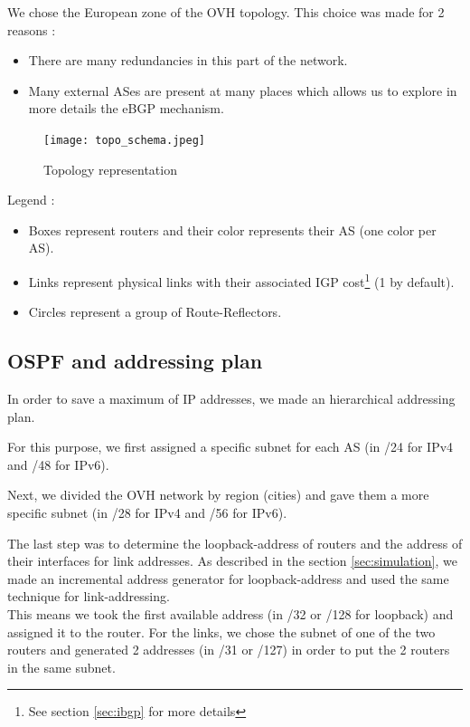 \documentclass[letter, 9pt, conference]{ieeeconf}
\begin{document}
We chose the European zone of the OVH \cite{OVHweathermap} topology. This choice was made for 2 reasons : 

\begin{itemize}
    \item There are many redundancies in this part of the network. 
    \item Many external ASes are present at many places which allows us to explore in more details the eBGP mechanism. 
\end{itemize}

\begin{figure}[H]
    \texttt{[image: topo\_schema.jpeg]}
    \caption{Topology representation}
    \label{fig:topo_schema}
\end{figure}

Legend : 
\begin{itemize}
    \item Boxes represent routers and their color represents their AS (one color per AS). 
    \item Links represent physical links with their associated IGP cost\footnote{See section \ref{sec:ibgp} for more details} (1 by default). 
    \item Circles represent a group of Route-Reflectors. 
\end{itemize}



\subsection{OSPF and addressing plan}
\label{sec:ospf}

In order to save a maximum of IP addresses, we made an hierarchical addressing plan. 

For this purpose, we first assigned a specific subnet for each AS (in /24 for IPv4 and /48 for IPv6). 

Next, we divided the OVH network by region (cities) and gave them a more specific subnet (in /28 for IPv4 and /56 for IPv6). 

The last step was to determine the loopback-address of routers and the address of their interfaces for link addresses. As described in the section \ref{sec:simulation}, we made an incremental address generator for loopback-address and used the same technique for link-addressing. \\
This means we took the first available address (in /32 or /128 for loopback) and assigned it to the router. For the links, we chose the subnet of one of the two routers and generated 2 addresses (in /31 or /127) in order to put the 2 routers in the same subnet. 
\end{document}
